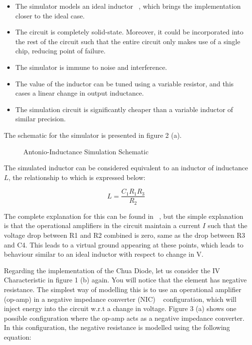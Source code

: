 \documentclass[jou,apacite]{apa6}
\begin{document}
\begin{itemize}
 \item The simulator models an ideal inductor ~\cite{side}, which brings the implementation closer to the ideal case.
 \item The circuit is completely solid-state. Moreover, it could be incorporated into the rest of the circuit such that the entire circuit only makes use of a single chip, reducing point of failure.
 \item The simulator is immune to noise and interference.
 \item The value of the inductor can be tuned using a variable resistor, and this cases a linear change in output inductance.
 \item The simulation circuit is significantly cheaper than a variable inductor of similar precision.
\end{itemize}

The schematic for the simulator is presented in figure 2 (a). 

\begin{figure}[H]
\caption{Antonio-Inductance Simulation Schematic}
\end{figure}

The simulated inductor can be considered equivalent to an inductor of inductance $L$, the relationship to which is expressed below:

\begin{equation}
L = \frac{C_1 R_1 R_3}{R_2}
\end{equation}

The complete explanation for this can be found in ~\cite{side}, but the simple explanation is that the operational amplifiers in the circuit maintain a current $I$ such that the voltage drop between R1 and R2 combined is zero, same as the drop between R3 and C4. This leads to a virtual ground appearing at these points, which leads to behaviour similar to an ideal inductor with respect to change in V.

Regarding the implementation of the Chua Diode, let us consider the IV Characteristic in figure 1 (b) again. You will notice that the element has negative resistance. The simplest way of modelling this is to use an operational amplifier (op-amp) in a negative impedance converter (NIC) ~\cite{w.k_} configuration, which will inject energy into the circuit w.r.t a change in voltage. Figure 3 (a) shows one possible configuration where the op-amp acts as a negative impedance converter. In this configuration, the negative resistance is modelled using the following equation:
\end{document}
